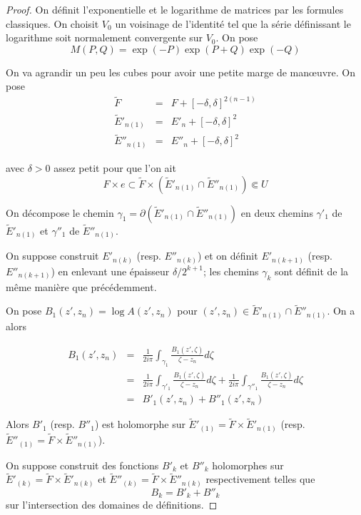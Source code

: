 \documentclass{article}
\theoremstyle{definition}
\theoremstyle{remarque}
\begin{document}
\begin{proof}
On définit l'exponentielle et le logarithme de matrices par les formules classiques. On choisit $V_0$ un voisinage de l'identité tel que la série définissant le logarithme soit normalement convergente sur $V_0$. On pose
$$M(P, Q) =  \exp(-P)\exp(P+Q)\exp(-Q)$$

On va agrandir un peu les cubes pour avoir une petite marge de manœuvre. On pose
\begin{eqnarray}
\nonumber \tilde{F} &=& F + [-\delta,\delta]^{2(n-1)} \\
\nonumber \tilde{E}'_{n(1)} &=& E'_n + [-\delta,\delta]^2 \\
\nonumber \tilde{E}''_{n(1)} &=& E''_n + [-\delta,\delta]^2
\end{eqnarray}

avec $\delta > 0$ assez petit pour que l'on ait
$$F \times e \subset \tilde{F} \times (\tilde{E}'_{n(1)} \cap \tilde{E}''_{n(1)}) \Subset U$$

On décompose le chemin $\gamma_1 = \partial(\tilde{E}'_{n(1)} \cap \tilde{E}''_{n(1)})$ en deux chemins $\gamma'_1$ de $\tilde{E}'_{n(1)}$ et $\gamma''_1$ de $\tilde{E}''_{n(1)}$.

On suppose construit $E'_{n(k)}$ (resp. $E''_{n(k)}$) et on définit $E'_{n(k+1)}$ (resp. $E''_{n(k+1)}$) en enlevant une épaisseur $\delta/2^{k+1}$; les chemins $\gamma_k$ sont définit de la même manière que précédemment.

On pose $B_1(z', z_n)=\log A(z',z_n)$ pour $(z', z_n) \in \tilde{E}'_{n(1)} \cap \tilde{E}''_{n(1)}$. On a alors

\begin{eqnarray}
\nonumber B_1(z', z_n) &=& \frac{1}{2i\pi} \int_{\gamma_{1}} \frac{B_1(z', \zeta)}{\zeta - z_n} d\zeta \\
\nonumber &=& \frac{1}{2i\pi} \int_{\gamma'_{1}} \frac{B_1(z', \zeta)}{\zeta - z_n} d\zeta + \frac{1}{2i\pi} \int_{\gamma''_{1}} \frac{B_1(z', \zeta)}{\zeta - z_n} d\zeta \\
\nonumber &=& B'_1(z', z_n) + B''_1(z', z_n)
\end{eqnarray}

Alors $B'_1$ (resp. $B''_1$) est holomorphe sur $\tilde{E}'_{(1)}=\tilde{F} \times \tilde{E}'_{n(1)}$ (resp. $\tilde{E}''_{(1)}=\tilde{F} \times \tilde{E}''_{n(1)}$).

On suppose construit des fonctions $B'_k$ et $B''_k$ holomorphes sur $\tilde{E}'_{(k)}=\tilde{F} \times \tilde{E}'_{n(k)}$ et $\tilde{E}''_{(k)}=\tilde{F} \times \tilde{E}''_{n(k)}$ respectivement telles que $$B_k = B'_k + B''_k$$
sur l'intersection des domaines de définitions.


\end{proof}
\end{document}
